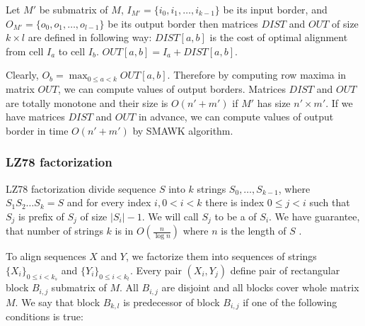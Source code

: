 \begin{definition}\cite{Crochemore2002}
Let $M'$ be submatrix of $M$, $I_{M'}=\{i_0,i_1,\dots,i_{k-1}\}$ be its input
border, and $O_{M'}=\{o_0,o_1,\dots,o_{l-1}\}$ be its output border then
matrices
$DIST$ and $OUT$ of size $k\times l$ are defined in following way:
$DIST[a,b]$ is the cost of optimal alignment from cell $I_a$ to cell $I_b$.
$OUT[a,b]=I_a+DIST[a,b]$.
\end{definition}

Clearly, $O_b=\max_{0\leq a < k}OUT[a,b]$. Therefore by computing row maxima in
matrix $OUT$, we can compute values of output borders. Matrices $DIST$ and $OUT$
are totally monotone \cite{Crochemore2002} and their size is $O(n'+m')$ if $M'$ has size
$n'\times m'$. If we have matrices $DIST$ and $OUT$ in advance, we can compute
values of output border in time $O(n'+m')$ by SMAWK algorithm.


\subsubsection{LZ78 factorization}

LZ78 factorization divide sequence $S$ into $k$ strings $S_0,\dots,S_{k-1}$, where
$S_1S_2\dots S_k=S$ and for every index  $i,0< i <k$ there is index $0\leq j<i$
such that $S_j$ is prefix of $S_j$ of size $|S_i|-1$. We will call $S_j$ to be a
 of $S_i$. 
We have guarantee, that number of strings $k$ is in  $O(\frac{n}{\log n})$ where
$n$ is the length of $S$ \cite{}. 

To align sequences $X$ and $Y$, we factorize them into sequences of strings
$\{X_i\}_{0\leq i < k_s}$ and $\{Y_i\}_{0\leq i<k_t}$.  Every pair $(X_i,Y_j)$
define pair of rectangular block $B_{i,j}$ submatrix of $M$.  All $B_{i,j}$ are
disjoint and all blocks cover whole matrix $M$. We say that block $B_{k,l}$ is
predecessor of block $B_{i,j}$ if one of the following conditions is true:

